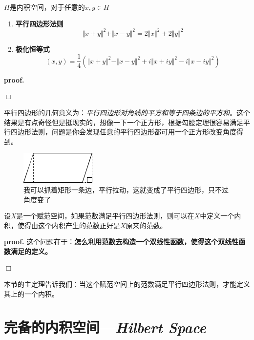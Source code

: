 \begin{mdframed}
    \begin{lemma}
        $H$是内积空间，对于任意的$x,y\in H$
        \begin{enumerate}[itemindent=2em]
            \item \textbf{平行四边形法则}
            \begin{equation}
                \Vert x+y\Vert^2+\Vert x-y\Vert^2=2\Vert x\Vert^2+2\Vert y\Vert^2
            \end{equation}
            \item \textbf{极化恒等式}
            \begin{equation}
                (x,y)=\frac{1}{4}(\Vert x+y\Vert^2-\Vert x-y\Vert^2+i\Vert x+iy\Vert^2-i\Vert x-iy\Vert^2)
            \end{equation}
        \end{enumerate}
    \end{lemma}
\end{mdframed}
\textbf{proof.} 

$\Box$

平行四边形的几何意义为：\textsl{平行四边形对角线的平方和等于四条边的平方和}。这个结果是有点奇怪但是挺现实的，想像一下一个正方形，根据勾股定理很容易满足平行四边形法则，问题是你会发现任意的平行四边形都可用一个正方形改变角度得到。
\begin{figure}[H]
    \centering
    \includegraphics[scale=0.8]{figures/平行四边形法则.png}
    \caption{我可以抓着矩形一条边，平行拉动，这就变成了平行四边形，只不过角度变了}
\end{figure}
\begin{mdframed}
    \begin{theorem}
        设$X$是一个赋范空间，如果范数满足平行四边形法则，则可以在$X$中定义一个内积，使得由这个内积产生的范数正好是$X$原来的范数。
    \end{theorem}
\end{mdframed}
\textbf{proof.} 这个问题在于：\textbf{怎么利用范数去构造一个双线性函数，使得这个双线性函数满足的定义。}

$\Box$

本节的主定理告诉我们：当这个赋范空间上的范数满足平行四边形法则，才能定义其上的一个内积。

\section{完备的内积空间—\textsl{Hilbert Space}}

